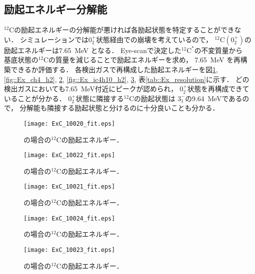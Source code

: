 \documentclass[../master]{subfiles}
\begin{document}
\subsection{励起エネルギー分解能}
${}^{12}\mathrm{C}$の励起エネルギーの分解能が悪ければ各励起状態を特定することができない．
シミュレーションでは$0_2^+$状態経由での崩壊を考えているので，
${}^{12}\mathrm{C}(0_2^+)$の励起エネルギーは\SI{7.65}{\mega\electronvolt} となる．
Eye-scanで決定した${}^{12}\mathrm{C}^{*}$の不変質量から
基底状態の${}^{12}\mathrm{C}$の質量を減じることで励起エネルギーを求め，
\SI{7.65}{\mega\electronvolt} を再構築できるか評価する．
各検出ガスで再構成した励起エネルギーを図\ref{fig::Ex_ch4}, \ref{fig::Ex_ch4_h2}, \ref{fig::Ex_ch4_he},
\ref{fig::Ex_ic4h10_h2}, \ref{fig::Ex_ic4h10_he}, 表\ref{tab::Ex_resolution}に示す．
どの検出ガスにおいても\SI{7.65}{\mega\electronvolt}付近にピークが認められ，
$0_2^+$状態を再構成できていることが分かる．
$0_2^+$状態に隣接する${}^{12}\mathrm{C}$の励起状態は%
$3_1^-$の\SI{9.64}{\mega\electronvolt}であるので，
分解能も隣接する励起状態と分けるのに十分良いことも分かる．
\begin{figure}
  \centering
  \begin{minipage}{0.45\columnwidth}
    \centering
    \texttt{[image: ExC\_10020\_fit.eps]}
    \caption{\Methane の場合の${}^{12}\mathrm{C}$の励起エネルギー．}
    \label{fig::Ex_ch4}
  \end{minipage}
\end{figure}
\begin{figure}
  \centering
  \begin{minipage}{0.45\columnwidth}
    \centering
    \texttt{[image: ExC\_10022\_fit.eps]}
    \caption{\MethaneHydro の場合の${}^{12}\mathrm{C}$の励起エネルギー．}
    \label{fig::Ex_ch4_h2}
  \end{minipage}
  \begin{minipage}{0.45\columnwidth}
    \centering
    \texttt{[image: ExC\_10021\_fit.eps]}
    \caption{\MethaneHerium の場合の${}^{12}\mathrm{C}$の励起エネルギー．}
    \label{fig::Ex_ch4_he}
  \end{minipage}
\end{figure}
\begin{figure}
  \centering
  \begin{minipage}{0.45\columnwidth}
    \centering
    \texttt{[image: ExC\_10024\_fit.eps]}
    \caption{\isoButaneHydro の場合の${}^{12}\mathrm{C}$の励起エネルギー．}
    \label{fig::Ex_ic4h10_h2}
  \end{minipage}
  \begin{minipage}{0.45\columnwidth}
    \centering
    \texttt{[image: ExC\_10023\_fit.eps]}
    \caption{\isoButaneHerium の場合の${}^{12}\mathrm{C}$の励起エネルギー．}
    \label{fig::Ex_ic4h10_he}
  \end{minipage}
\end{figure}
\end{document}
